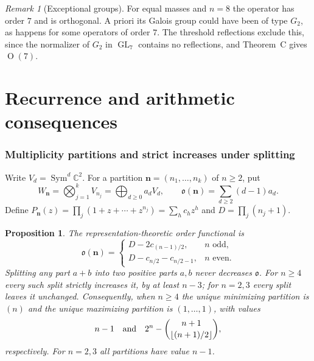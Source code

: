 \documentclass[11pt,a4paper]{article}
\newtheorem{proposition}[theorem]{Proposition}
\theoremstyle{definition}
\theoremstyle{remark}
\newtheorem{remark}[theorem]{Remark}
\numberwithin{equation}{section}
\DeclareMathOperator{\GL}{GL}
\DeclareMathOperator{\Ort}{O}
\begin{document}
\begin{remark}[Exceptional groups]
For equal masses and $n=8$ the operator has order $7$ and is orthogonal. A priori its Galois group could have been of type $G_2$, as happens for some operators of order $7$. The threshold reflections exclude this, since the normalizer of $G_2$ in $\GL_7$ contains no reflections, and Theorem~C gives $\Ort(7)$.
\end{remark}


\clearpage
\part{Recurrence and arithmetic consequences}\label{part:transfers}
\section{Multiplicity partitions and strict increases under splitting}

Write $V_d=\operatorname{Sym}^d\mathbb C^2$. For a partition
$\boldsymbol n=(n_1,\ldots,n_k)$ of $n\ge2$, put
\[
 W_{\boldsymbol n}=\bigotimes_{j=1}^k V_{n_j}
   =\bigoplus_{d\ge0}a_dV_d,
 \qquad \mathfrak o(\boldsymbol n)=\sum_{d\ge2}(d-1)a_d.
\]
Define $P_{\boldsymbol n}(z)=\prod_j(1+z+\cdots+z^{n_j})
=\sum_h c_hz^h$ and $D=\prod_j(n_j+1)$.

\begin{proposition}\label{mc:prop:partition-order}
The representation-theoretic order functional is
\[
 \mathfrak o(\boldsymbol n)=
 \begin{cases}
 D-2c_{(n-1)/2},&n\text{ odd},\\
 D-c_{n/2}-c_{n/2-1},&n\text{ even}.
 \end{cases}
\]
Splitting any part $a+b$ into two positive parts $a,b$ never decreases
$\mathfrak o$. For $n\ge4$ every such split strictly increases it, by at
least $n-3$; for $n=2,3$ every split leaves it unchanged. Consequently,
when $n\ge4$ the unique minimizing partition is $(n)$ and the unique
maximizing partition is $(1,\ldots,1)$, with values
\[
 n-1\quad\hbox{and}\quad
 2^n-\binom{n+1}{\lfloor(n+1)/2\rfloor},
\]
respectively. For $n=2,3$ all partitions have value $n-1$.
\end{proposition}
\end{document}
